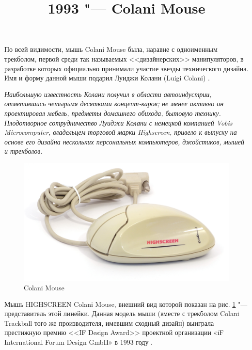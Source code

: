 \documentclass[11pt, a4paper]{article}
\begin{document}
\title{1993 "--- Colani Mouse}
\date{}
\maketitle

По всей видимости, мышь Colani Mouse была, наравне с одноименным трекболом, первой среди так называемых <<дизайнерских>> манипуляторов, в разработке которых официально принимали участие звезды технического дизайна. Имя и форму данной мыши подарил Луиджи Колани (Luigi Colani) \cite{wiki}.

\textit{Наибольшую известность Колани получил в области автоиндустрии, отметившись четырьмя десятками концепт-каров; не менее активно он проектировал мебель, предметы домашнего обихода, бытовую технику. Плодотворное сотрудничество Луиджи Колани с немецкой компанией Vobis Microcomputer, владельцем торговой марки Highscreen, привело к выпуску на основе его дизайна нескольких персональных компьютеров, джойстиков, мышей и трекболов.}

\begin{figure}[h]
    \centering
    \includegraphics[scale=0.6]{1993_colani_mouse/pic_60.jpg}
    \caption{Colani Mouse}
    \label{fig:ColaniMousePic}
\end{figure}

Мышь HIGHSCREEN Colani Mouse, внешний вид которой показан на рис. \ref{fig:ColaniMousePic} "--- представитель этой линейки. Данная модель мыши (вместе с трекболом Colani Trackball того же производителя, имевшим сходный дизайн) выиграла престижную премию <<IF Design Award>> проектной организации «iF International Forum Design GmbH» в 1993 году \cite{award}.
\end{document}
